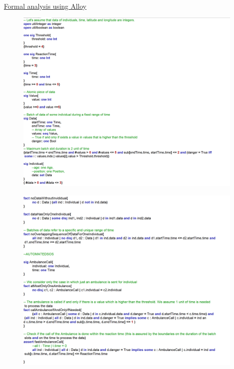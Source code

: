 \documentclass{article}
\begin{document}
\begin{legal}
\begin{legal}
\begin{legal}
			\\
		\end{legal}
		\end{legal}
	\newpage
	\item \underline{Formal analysis using Alloy}\\
		\begin{figure}[H]
			\newpage
			\includegraphics[width=\linewidth]{./images/alloy/code/automated_1.PNG}
		\end{figure}
		\begin{figure}[H]
			\includegraphics[width=\linewidth]{./images/alloy/code/automated_2.PNG}

\end{figure}
\end{legal}
\end{document}
